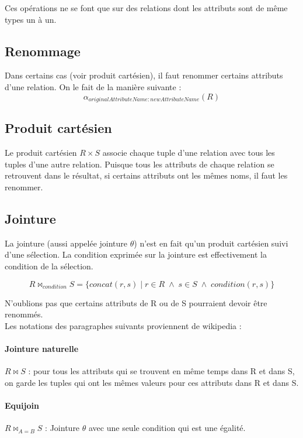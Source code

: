 \documentclass[a4paper]{article}
\begin{document}
  Ces opérations ne se font que sur des relations dont les attributs sont
  de même types un à un.

  \subsection{Renommage}
  Dans certains cas (voir produit cartésien), il faut renommer certains attributs
  d'une relation. On le fait de la manière suivante :
  $$ \alpha_{originalAttributeName:newAttributeName}(R) $$

  \subsection{Produit cartésien}
  Le produit cartésien $R \times S$ associe chaque tuple d'une relation avec tous les tuples
  d'une autre relation. Puisque tous les attributs de chaque relation se retrouvent
  dans le résultat, si certains attributs ont les mêmes noms, il faut les renommer.

  \subsection{Jointure}
  La jointure (aussi appelée jointure $\theta$) n'est en fait qu'un produit cartésien suivi d'une sélection. 
  La condition exprimée sur la jointure est effectivement la condition de la sélection.

  $$R \bowtie_{condition} S = \{concat(r,s)\; |\; r \in R\; \land \; s \in S\; \land \; condition(r,s)\} $$

  N'oublions pas que certains attributs de R ou de S pourraient devoir être renommés.\\

  Les notations des paragraphes suivants proviennent de wikipedia :

  \paragraph{Jointure naturelle} $R \bowtie S$ : pour tous les attributs qui se trouvent en même temps dans R et dans S, on garde les tuples qui ont les mêmes 
  valeurs pour ces attributs dans R et dans S.

  \paragraph{Equijoin} $R \bowtie_{A=B} S$ : Jointure $\theta$ avec une seule 
  condition qui est une égalité.\\
\end{document}
